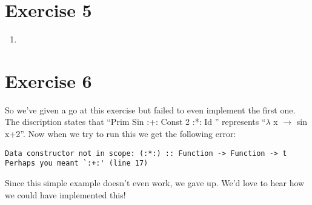 \documentclass{article}
\begin{document}
\section*{Exercise 5}
\begin{enumerate}
  \item
\end{enumerate}

\section*{Exercise 6}
So we've given a go at this exercise but failed to even implement the first one. The discription states that ``Prim Sin :+: Const 2 :*: Id '' represents ``$\lambda$ x $\rightarrow$ sin x+2''. Now when we try to run this we get the following error:

\begin{lstlisting}
Data constructor not in scope: (:*:) :: Function -> Function -> t
Perhaps you meant `:+:' (line 17)
\end{lstlisting}
Since this simple example doesn't even work, we gave up. We'd love to hear how we could have implemented this!
\end{document}
